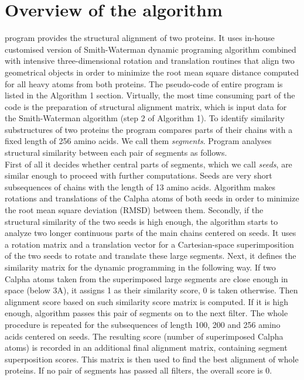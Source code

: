 \section{Overview of the algorithm}
\prog{} program provides the structural alignment of two proteins.
It uses in-house customised version of Smith-Waterman dynamic programing
algorithm combined with intensive three-dimensional rotation and translation
routines that align two geometrical objects in order to minimize the root mean square
distance computed for all heavy atoms from both proteins.
The pseudo-code of entire program is listed in the Algorithm 1 section.
Virtually, the most time consuming part of the code is the preparation of structural
alignment matrix, which is input data for the Smith-Waterman algorithm (step 2 of Algorithm 1).
To identify similarity substructures of two proteins the program compares
parts of their chains with a fixed length of 256 amino acids.
We call them \emph{segments}.
Program analyses structural similarity between each pair of segments as follows.\\
First of all it decides whether central parts of segments, which we call
\emph{seeds}, are similar enough to proceed with further computations.
Seeds are very short subsequences of chains with the length of 13 amino acids.
Algorithm makes rotations and translations of the Calpha atoms of both seeds in
order to minimize the root mean square deviation (RMSD) between them.
Secondly, if the structural similarity of the two seeds is high enough,
the algorithm starts to analyze two longer continuous parts of the main chains
centered on seeds.
It uses a rotation matrix and a translation vector for a Cartesian-space
superimposition of the two seeds to rotate and translate these large segments.
Next, it defines the similarity matrix for the dynamic programming in the
following way.
If two Calpha atoms taken from the superimposed large segments are close enough
in space (below 3A), it assigns 1 as their similarity score, 0 is taken
otherwise.
Then alignment score based on such similarity score matrix is computed.
If it is high enough, algorithm passes this pair of segments
on to the next filter.
The whole procedure is repeated for the subsequences of length 100, 200 and 256
amino acids centered on seeds.
The resulting score (number of superimposed Calpha atoms) is recorded in an
additional final alignment matrix, containing segment superposition scores.
This matrix is then used to find the best alignment of whole proteins.
If no pair of segments has passed all filters, the overall score is 0.

